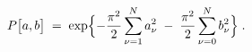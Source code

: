 \begin{equation}
P\bigl[a,b\bigr] \; = \; \exp \Bigl\{ - \frac{ \pi ^2 }{2} 
\sum _{\nu=1}^N a_\nu^2 \; - \; \frac{ \pi ^2 }{2} \sum _{\nu=0}^N b_\nu^2 
\Bigr\} \; . 
\label{fo2}
\end{equation}

